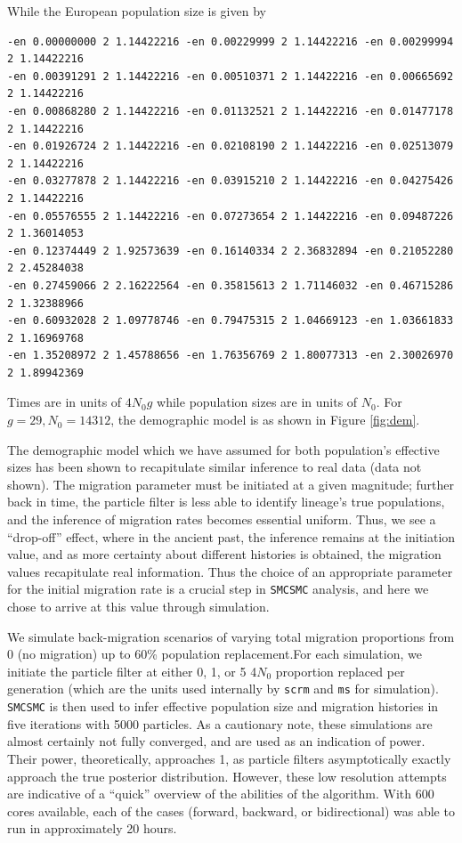 \documentclass{article}
\begin{document}
While the European population size is given by

\begin{verbatim}
-en 0.00000000 2 1.14422216 -en 0.00229999 2 1.14422216 -en 0.00299994 2 1.14422216
-en 0.00391291 2 1.14422216 -en 0.00510371 2 1.14422216 -en 0.00665692 2 1.14422216
-en 0.00868280 2 1.14422216 -en 0.01132521 2 1.14422216 -en 0.01477178 2 1.14422216
-en 0.01926724 2 1.14422216 -en 0.02108190 2 1.14422216 -en 0.02513079 2 1.14422216
-en 0.03277878 2 1.14422216 -en 0.03915210 2 1.14422216 -en 0.04275426 2 1.14422216
-en 0.05576555 2 1.14422216 -en 0.07273654 2 1.14422216 -en 0.09487226 2 1.36014053
-en 0.12374449 2 1.92573639 -en 0.16140334 2 2.36832894 -en 0.21052280 2 2.45284038 
-en 0.27459066 2 2.16222564 -en 0.35815613 2 1.71146032 -en 0.46715286 2 1.32388966
-en 0.60932028 2 1.09778746 -en 0.79475315 2 1.04669123 -en 1.03661833 2 1.16969768
-en 1.35208972 2 1.45788656 -en 1.76356769 2 1.80077313 -en 2.30026970 2 1.89942369
\end{verbatim}

Times are in units of $4N_0g$ while population sizes are in units of $N_0$. For $g=29, N_0 = 14312$, the demographic model is as shown in Figure \ref{fig:dem}.  

The demographic model which we have assumed for both population's effective sizes has been shown to recapitulate similar inference to real data (data not shown). The migration parameter must be initiated at a given magnitude; further back in time, the particle filter is less able to identify lineage's true populations, and the inference of migration rates becomes essential uniform. Thus, we see a ``drop-off'' effect, where in the ancient past, the inference remains at the initiation value, and as more certainty about different histories is obtained, the migration values recapitulate real information. Thus the choice of an appropriate parameter for the initial migration rate is a crucial step in {\tt SMCSMC} analysis, and here we chose to arrive at this value through simulation.

We simulate back-migration scenarios of varying total migration proportions from 0 (no migration) up to 60\% population replacement.For each simulation, we initiate the particle filter at either 0, 1, or 5 4$N_0$ proportion replaced per generation (which are the units used internally by {\tt scrm} and {\tt ms} for simulation).  {\tt SMCSMC} is then used to infer effective population size and migration histories in five iterations with 5000 particles. As a cautionary note, these simulations are almost certainly not fully converged, and are used as an indication of power. Their power, theoretically, approaches 1, as particle filters asymptotically exactly approach the true posterior distribution. However, these low resolution attempts are indicative of a ``quick'' overview of the abilities of the algorithm. With 600 cores available, each of the cases (forward, backward, or bidirectional) was able to run in approximately 20 hours. 
\end{document}
